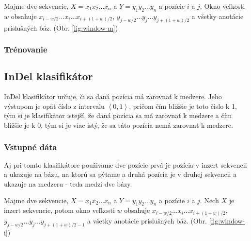 Majme dve sekvencie, $X = x_1 x_2 \dots x_n$ a $Y = y_1 y_2 \dots y_n$ a pozície $i$ a $j$. Okno veľkosti $w$ obsahuje $x_{i - w/2}\dots x_i \dots x_{i + (1 + w)/2}$, $y_{j - w/2}\dots y_j \dots y_{j + (1 + w)/2}$ a všetky anotácie príslušných báz. (Obr. \ref{fig:window-m})


\subsubsection{Trénovanie}
\todo

\subsection{InDel klasifikátor}

InDel klasifikátor určuje, či sa daná pozícia má zarovnať k medzere. Jeho výstupom je opäť  číslo z intervalu $\left<0,1\right>$, pričom čím bližšie je toto čislo k 1, tým si je klasifikátor istejší, že daná pozícia sa má zarovnať k medzere a čím bližšie je k 0, tým si je viac istý, že sa táto pozícia nemá zarovnať k medzere.

\subsubsection{Vstupné dáta}
Aj pri tomto klasifikátore použivame dve pozície prvá je pozícia v inzert sekvencii a ukazuje na bázu, na ktorú sa pýtame a druhá pozícia je v druhej sekvencii a ukazuje na medzeru - teda medzi dve bázy.

Majme dve sekvencie, $X = x_1 x_2 \dots x_n$ a $Y = y_1 y_2 \dots y_n$ a pozície $i$ a $j$. Nech $X$ je inzert sekvencie, potom okno veľkosti $w$ obsahuje $x_{i - w/2}\dots x_i \dots x_{i + (1 + w)/2}$, $y_{j - w/2}\dots y_j \dots y_{j + (1 + w)/2 - 1}$ a všetky anotácie príslušných báz. (Obr. \ref{fig:window-i})


